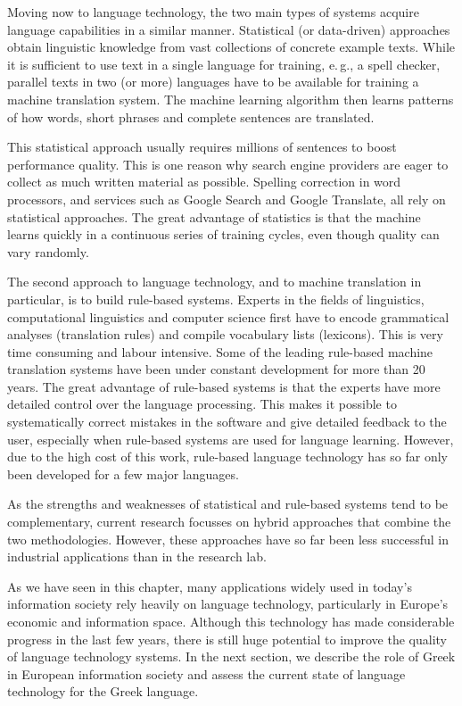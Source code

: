 \documentclass[]{../../metanetpaper}
\begin{document}
\begin{multicols}{2}
Moving now to language technology, the two main types of systems acquire language capabilities in a similar manner. Statistical (or data-driven) approaches obtain linguistic knowledge from vast collections of concrete example texts. While it is sufficient to use text in a single language for training, e.\,g., a spell checker, parallel texts in two (or more) languages have to be available for training a machine translation system. The machine learning algorithm then learns patterns of how words, short phrases and complete sentences are translated. 

This statistical approach usually requires millions of sentences to boost performance quality. This is one reason why search engine providers are eager to collect as much written material as possible. Spelling correction in word processors, and services such as Google Search and Google Translate, all rely on statistical approaches. The great advantage of statistics is that the machine learns quickly in a continuous series of training cycles, even though quality can vary randomly.

The second approach to language technology, and to machine translation in particular, is to build rule-based systems. Experts in the fields of linguistics, computational linguistics and computer science first have to encode grammatical analyses (translation rules) and compile vocabulary lists (lexicons). This is very time consuming and labour intensive. Some of the leading rule-based machine translation systems have been under constant development for more than 20 years. The great advantage of rule-based systems is that the experts have more detailed control over the language processing. This makes it possible to systematically correct mistakes in the software and give detailed feedback to the user, especially when rule-based systems are used for language learning. However, due to the high cost of this work, rule-based language technology has so far only been developed for a few major languages. 


As the strengths and weaknesses of statistical and rule-based systems tend to be complementary, current research focusses on hybrid approaches that combine the two methodologies. However, these approaches have so far been less successful in industrial applications than in the research lab. 

As we have seen in this chapter, many applications widely used in today’s information society rely heavily on language technology, particularly in Europe’s economic and information space. Although this technology has made considerable progress in the last few years, there is still huge potential to improve the quality of language technology systems. In the next section, we describe the role of Greek in European information society and assess the current state of language technology for the Greek language.
\end{multicols}
\end{document}
